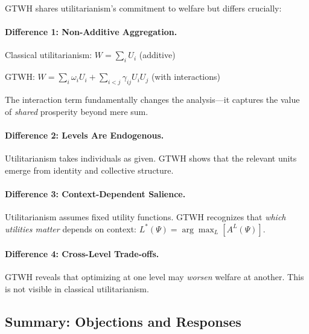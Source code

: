 GTWH shares utilitarianism's commitment to welfare but differs crucially:

\paragraph{Difference 1: Non-Additive Aggregation.}

Classical utilitarianism: $W = \sum_i U_i$ (additive)

GTWH: $W = \sum_i \omega_i U_i + \sum_{i<j} \gamma_{ij} U_i U_j$ (with interactions)

The interaction term fundamentally changes the analysis---it captures the value 
of \textit{shared} prosperity beyond mere sum.

\paragraph{Difference 2: Levels Are Endogenous.}

Utilitarianism takes individuals as given. GTWH shows that the relevant units 
emerge from identity and collective structure.

\paragraph{Difference 3: Context-Dependent Salience.}

Utilitarianism assumes fixed utility functions. GTWH recognizes that \textit{which 
utilities matter} depends on context: $L^*(\Psi) = \arg\max_L [A^L(\Psi)]$.

\paragraph{Difference 4: Cross-Level Trade-offs.}

GTWH reveals that optimizing at one level may \textit{worsen} welfare at another. 
This is not visible in classical utilitarianism.

\subsection{Summary: Objections and Responses}

